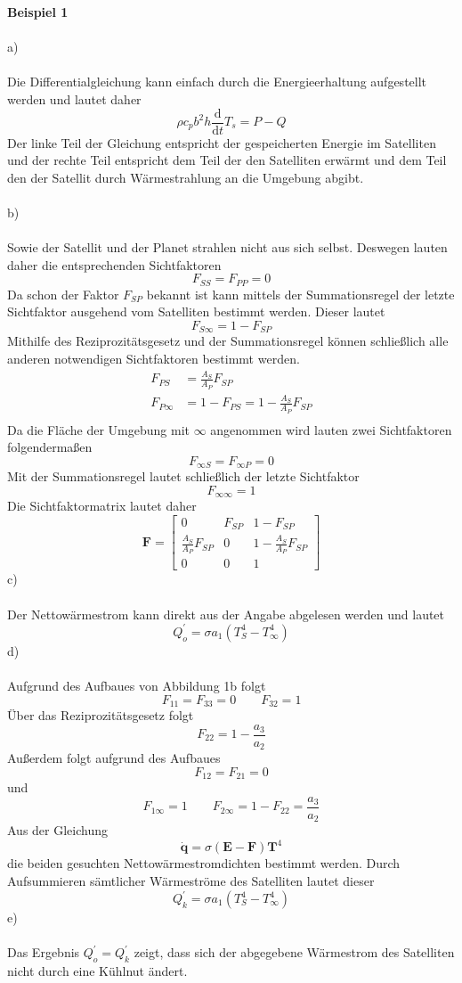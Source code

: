 \textbf{Beispiel 1}\\ \\
a) \\ \\
Die Differentialgleichung kann einfach durch die Energieerhaltung aufgestellt werden und lautet daher
\[
	\rho c_p b^2 h \frac{\text{d}}{\text{d}t}T_s = P - Q 
\]
Der linke Teil der Gleichung entspricht der gespeicherten Energie im Satelliten und der rechte Teil entspricht dem Teil der den Satelliten erwärmt und dem Teil den der Satellit durch Wärmestrahlung an die Umgebung abgibt.\\ \\
b)\\ \\
Sowie der Satellit und der Planet strahlen nicht aus sich selbst. Deswegen lauten daher die entsprechenden Sichtfaktoren
\[
	F_{SS} = F_{PP} = 0
\] 
Da schon der Faktor $F_{SP}$ bekannt ist kann mittels der Summationsregel der letzte Sichtfaktor ausgehend vom Satelliten bestimmt werden. Dieser lautet
\[
	F_{S\infty} = 1 - F_{SP}
\]
Mithilfe des Reziprozitätsgesetz und der Summationsregel können schließlich alle anderen notwendigen Sichtfaktoren bestimmt werden.
\begin{align*}
	F_{PS} &= \frac{A_S}{A_P}F_{SP} \\
	F_{P\infty} &= 1 - F_{PS} = 1 - \frac{A_S}{A_P}F_{SP} \\
\end{align*}
Da die Fläche der Umgebung mit $\infty$ angenommen wird lauten zwei Sichtfaktoren folgendermaßen
\[
	F_{\infty S} = F_{\infty P} = 0
\]
Mit der Summationsregel lautet schließlich der letzte Sichtfaktor
\[
	F_{\infty \infty} = 1 
\]
Die Sichtfaktormatrix lautet daher
\[
	\textbf{F} = \begin{bmatrix}
		0 & F_{SP} & 1 - F_{SP} \\
		\frac{A_S}{A_P}F_{SP} & 0 & 1 - \frac{A_S}{A_P}F_{SP} \\
		0 & 0 & 1
	\end{bmatrix}
\]
\newpage
\noindent
c)\\ \\
Der Nettowärmestrom kann direkt aus der Angabe abgelesen werden und lautet
\[
	Q^{'}_o = \sigma a_1 (T_S^4 - T_\infty^4)
\]
d)\\ \\
Aufgrund des Aufbaues von Abbildung 1b folgt
\[
	F_{11} = F_{33} = 0 \qquad F_{32} = 1
\]
Über das Reziprozitätsgesetz folgt
\[
	F_{22} = 1 - \frac{a_3}{a_2}
\]
Außerdem folgt aufgrund des Aufbaues
\[
	F_{12} = F_{21} = 0
\]
und 
\[
	F_{1\infty} = 1 \qquad F_{2\infty} = 1 - F_{22} = \frac{a_3}{a_2}
\]
Aus der Gleichung
\[
	\dot{\textbf{q}} = \sigma(\textbf{E} - \textbf{F})\textbf{T}^4	
\]
die beiden gesuchten Nettowärmestromdichten bestimmt werden. Durch Aufsummieren sämtlicher Wärmeströme des Satelliten lautet dieser 
\[
	Q^{'}_k = \sigma a_1 (T_S^4 - T_\infty^4)
\]
e)\\ \\
Das Ergebnis $Q^{'}_o = Q^{'}_k$ zeigt, dass sich der abgegebene Wärmestrom des Satelliten nicht durch eine Kühlnut ändert.\\ \\